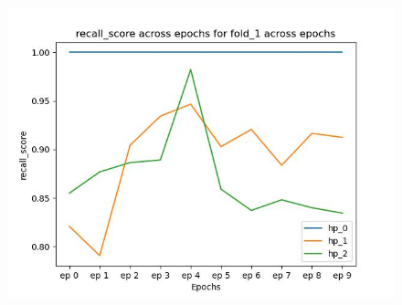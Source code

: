 \documentclass{article}
\begin{document}
\begin{figure}[H]
\includegraphics[scale = 0.75]{fold_1/recall_score}
\end{figure}
\end{document}
